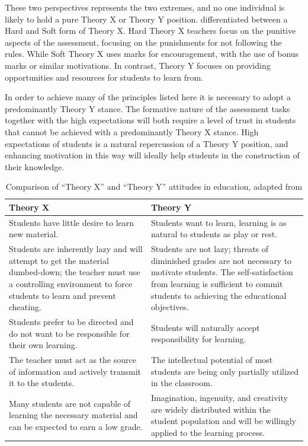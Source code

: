 These two perspectives represents the two extremes, and no one individual is likely to hold a pure Theory X or Theory Y position. \citet{Markwell:2004} differentiated between a Hard and Soft form of Theory X. Hard Theory X teachers focus on the punitive aspects of the assessment, focusing on the punishments for not following the rules. While Soft Theory X uses marks for encouragement, with the use of bonus marks or similar motivations. In contrast, Theory Y focuses on providing opportunities and resources for students to learn from.

In order to achieve many of the principles listed here it is necessary to adopt a predominantly Theory Y stance. The formative nature of the assessment tasks together with the high expectations will both require a level of trust in students that cannot be achieved with a predominantly Theory X stance. High expectations of students is a natural repercussion of a Theory Y position, and enhancing motivation in this way will ideally help students in the construction of their knowledge.

\begin{landscape}
 \renewcommand{\arraystretch}{1.6}
 \begin{table}[htbp]
 	\caption{Comparison of ``Theory X'' and ``Theory Y'' attitudes in education, adapted from \citet{Markwell:2004}}
 	\label{tbl:theoryx_y}

    \begin{tabular}{p{4in}|p{4in}}
    \textbf{Theory X} & \textbf{Theory Y} \\
    \hline
    Students have little desire to learn new material. & Students want to learn, learning is as natural to students as play or rest. \\
    Students are inherently lazy and will attempt to get the material dumbed-down; the teacher must use a controlling environment to force students to learn and prevent cheating. & Students are not lazy; threats of diminished grades are not necessary to motivate students. The self-satisfaction from learning is sufficient to commit students to achieving the educational objectives. \\
    Students prefer to be directed and do not want to be responsible for their own learning. &  Students will naturally accept responsibility for learning. \\
    The teacher must act as the source of information and actively transmit it to the students. &  The intellectual potential of most students are being only partially utilized in the classroom. \\
    Many students are not capable of learning the necessary material and can be expected to earn a low grade. & Imagination, ingenuity, and creativity are widely distributed within the student population and will be willingly applied to the learning process. \\
    \end{tabular}
 \end{table}
\end{landscape}

